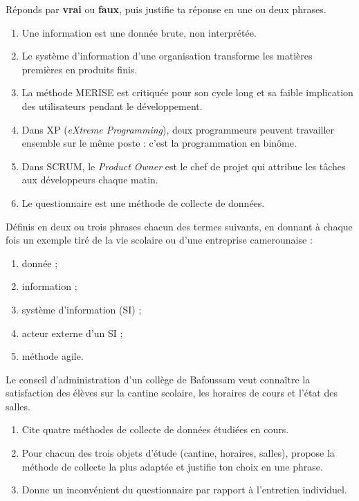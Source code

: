 \documentclass[11pt]{article}
\begin{document}
\begin{exercice}
Réponds par \textbf{vrai} ou \textbf{faux}, puis justifie ta réponse en une ou deux phrases.
\begin{enumerate}
    \item Une information est une donnée brute, non interprétée.
    \item Le système d'information d'une organisation transforme les matières premières en produits finis.
    \item La méthode MERISE est critiquée pour son cycle long et sa faible implication des utilisateurs pendant le développement.
    \item Dans XP (\emph{eXtreme Programming}), deux programmeurs peuvent travailler ensemble sur le même poste : c'est la programmation en binôme.
    \item Dans SCRUM, le \emph{Product Owner} est le chef de projet qui attribue les tâches aux développeurs chaque matin.
    \item Le questionnaire est une méthode de collecte de données.
\end{enumerate}
\end{exercice}

\begin{exercice}
Définis en deux ou trois phrases chacun des termes suivants, en donnant à chaque fois un exemple tiré de la vie scolaire ou d'une entreprise camerounaise :
\begin{enumerate}
    \item donnée ;
    \item information ;
    \item système d'information (SI) ;
    \item acteur externe d'un SI ;
    \item méthode agile.
\end{enumerate}
\end{exercice}

\begin{exercice}
Le conseil d'administration d'un collège de Bafoussam veut connaître la satisfaction des élèves sur la cantine scolaire, les horaires de cours et l'état des salles.
\begin{enumerate}
    \item Cite quatre méthodes de collecte de données étudiées en cours.
    \item Pour chacun des trois objets d'étude (cantine, horaires, salles), propose la méthode de collecte la plus adaptée et justifie ton choix en une phrase.
    \item Donne un inconvénient du questionnaire par rapport à l'entretien individuel.
\end{enumerate}
\end{exercice}
\end{document}
